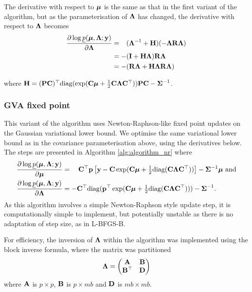 \documentclass{amsart}[12pt]
\begin{document}
			\noindent The derivative with respect to ${\boldsymbol \mu}$ is the same as that in the first variant of the algorithm, but 
			as the parameterisation of ${\boldsymbol \Lambda}$ has changed, the  derivative with respect to ${\boldsymbol \Lambda}$ becomes
			\begin{align*}
				\frac{\partial \log \underline{p}({\boldsymbol \mu}, {\boldsymbol \Lambda}; {\bf y})}{\partial {\boldsymbol\Lambda}}
				  & = \hphantom{-}({\boldsymbol \Lambda}^{-1} + {\bf H})(-{\boldsymbol \Lambda} {\bf R} {\boldsymbol \Lambda}) \\
				  & = -({\bf I} + {\bf H}{\boldsymbol \Lambda}){\bf R}{\boldsymbol \Lambda}                           \\
				  & = - ({\bf R}{\boldsymbol \Lambda} + {\bf H}{\boldsymbol \Lambda}{\bf R}{\boldsymbol \Lambda})                  
			\end{align*} 
					
			\noindent where ${\bf H} = ({\bf P} {\bf C})^\top \text{diag}(\exp({\bf C} {\boldsymbol \mu} + \tfrac{1}{2} {\bf C} {\boldsymbol \Lambda} {\bf C}^\top)) {\bf P} {\bf C} - {\boldsymbol \Sigma}^{-1}$.
					
			\subsubsection{GVA fixed point}
					
					
			This variant of the algorithm uses Newton-Raphson-like fixed point updates on the Gaussian variational lower
			bound. We optimise the same variational lower bound as in the covariance parameterisation above, using the
			derivatives below. The steps are presented in Algorithm \ref{alg:algorithm_nr} where	
			\begin{align*}
				\frac{\partial \log \underline{p}({\boldsymbol \mu}, {\boldsymbol \Lambda}; {\bf y})}{\partial {\boldsymbol\mu}}     & = \quad {\bf C}^\top{\bf p} \left [{\bf y} - {\bf C}\exp({\bf C} {\boldsymbol \mu} + \tfrac{1}{2} \text{diag}({\bf C} {\boldsymbol \Lambda} {\bf C}^\top)) \right ] - {\boldsymbol \Sigma}^{-1} {\boldsymbol \mu} \text{ and} \\
				\frac{\partial \log \underline{p}({\boldsymbol \mu}, {\boldsymbol \Lambda}; {\bf y})}{\partial {\boldsymbol\Lambda}} & = -{\bf C}^\top \text{diag}({\bf p}^\top \exp({\bf C} {\boldsymbol \mu} +\tfrac{1}{2} \text{diag}({\bf C} {\boldsymbol \Lambda} {\bf C}^\top))) - {\boldsymbol \Sigma}^{-1}.                             
			\end{align*}
			As this algorithm involves a simple Newton-Raphson style update step, it is computationally simple to
			implement, but potentially unstable as there is no adaptation of step size, as in L-BFGS-B.

			For efficiency, the inversion of ${\boldsymbol \Lambda}$ within the algorithm was implemented using the block inverse 
			formula, where	the matrix was partitioned
			\[
				{\boldsymbol \Lambda} =
				\begin{pmatrix}
					{\bf A} & {\bf B} \\
					{\bf B}^\top & {\bf D}
				\end{pmatrix}
			\]
			where ${\bf A}$ is $p \times p$, ${\bf B}$ is $p \times mb$ and ${\bf D}$ is $mb \times mb$.
\end{document}
